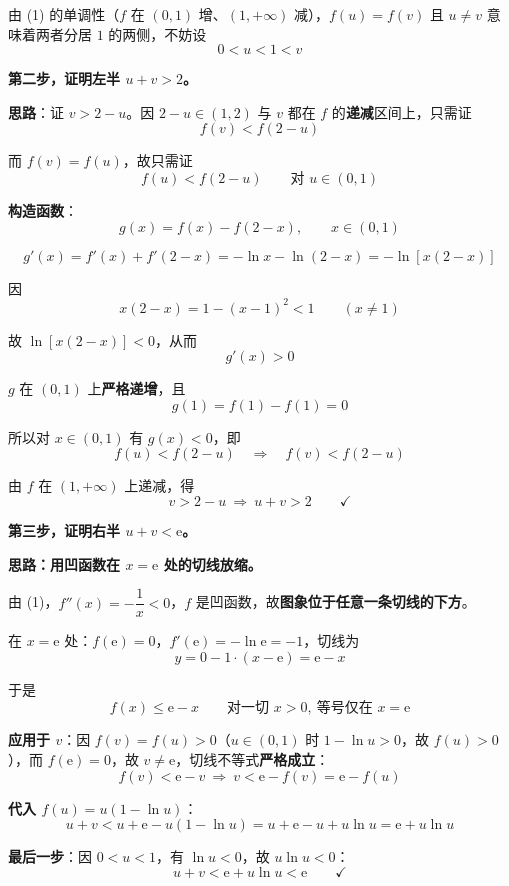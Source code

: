由 (1) 的单调性（$f$ 在 $(0,1)$ 增、$(1,+\infty)$ 减），$f(u)=f(v)$ 且 $u\ne v$ 意味着两者分居 $1$ 的两侧，不妨设
\[0<u<1<v\]

\par\medskip

\textbf{第二步，证明左半 $u+v>2$。}

\textbf{思路}：证 $v>2-u$。因 $2-u\in(1,2)$ 与 $v$ 都在 $f$ 的\textbf{递减}区间上，只需证
\[f(v)<f(2-u)\]

而 $f(v)=f(u)$，故只需证
\[f(u)<f(2-u)\qquad\text{对 }u\in(0,1)\]

\textbf{构造函数}：
\[g(x)=f(x)-f(2-x),\qquad x\in(0,1)\]

\[g'(x)=f'(x)+f'(2-x)=-\ln x-\ln(2-x)=-\ln\left[x(2-x)\right]\]

因
\[x(2-x)=1-(x-1)^{2}<1\qquad(x\ne1)\]

故 $\ln\left[x(2-x)\right]<0$，从而
\[g'(x)>0\]

$g$ 在 $(0,1)$ 上\textbf{严格递增}，且
\[g(1)=f(1)-f(1)=0\]

所以对 $x\in(0,1)$ 有 $g(x)<0$，即
\[f(u)<f(2-u)\quad\Longrightarrow\quad f(v)<f(2-u)\]

由 $f$ 在 $(1,+\infty)$ 上递减，得
\[v>2-u\ \Longrightarrow\ u+v>2\qquad\checkmark\]

\par\medskip

\textbf{第三步，证明右半 $u+v<\mathrm e$。}

\textbf{思路：用凹函数在 $x=\mathrm e$ 处的切线放缩。}

由 (1)，$f''(x)=-\dfrac1x<0$，$f$ 是凹函数，故\textbf{图象位于任意一条切线的下方}。

在 $x=\mathrm e$ 处：$f(\mathrm e)=0$，$f'(\mathrm e)=-\ln\mathrm e=-1$，切线为
\[y=0-1\cdot(x-\mathrm e)=\mathrm e-x\]

于是
\[f(x)\le\mathrm e-x\qquad\text{对一切 }x>0,\ \text{等号仅在 }x=\mathrm e\]

\textbf{应用于 $v$}：因 $f(v)=f(u)>0$（$u\in(0,1)$ 时 $1-\ln u>0$，故 $f(u)>0$），而 $f(\mathrm e)=0$，故 $v\ne\mathrm e$，切线不等式\textbf{严格成立}：
\[f(v)<\mathrm e-v\ \Longrightarrow\ v<\mathrm e-f(v)=\mathrm e-f(u)\]

\textbf{代入 $f(u)=u(1-\ln u)$}：
\[u+v<u+\mathrm e-u(1-\ln u)=u+\mathrm e-u+u\ln u=\mathrm e+u\ln u\]

\textbf{最后一步}：因 $0<u<1$，有 $\ln u<0$，故 $u\ln u<0$：
\[u+v<\mathrm e+u\ln u<\mathrm e\qquad\checkmark\]

\par\medskip

